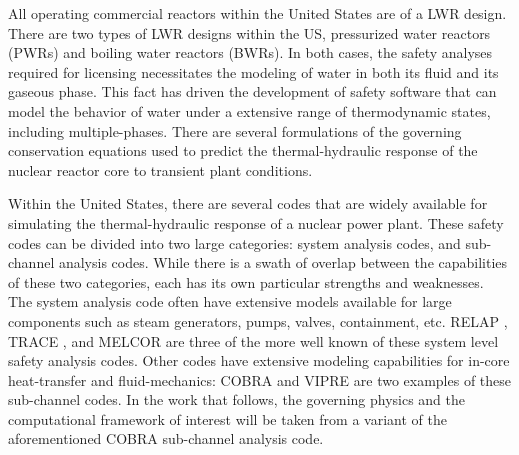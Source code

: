 All operating commercial reactors within the United States are of a LWR design.
There are two types of LWR designs within the US, pressurized water reactors (PWRs) and boiling water reactors (BWRs).
In both cases, the safety analyses required for licensing necessitates the modeling of water in both its fluid and its gaseous phase.
This fact has driven the development of safety software that can model the behavior of water under a extensive range of thermodynamic states, including multiple-phases.
There are several formulations of the governing conservation equations used to predict the thermal-hydraulic response of the nuclear reactor core to transient plant conditions.

Within the United States, there are several codes that are widely available for simulating the thermal-hydraulic response of a nuclear power plant.
These safety codes can be divided into two large categories: system analysis codes, and sub-channel analysis codes.
While there is a swath of overlap between the capabilities of these two categories, each has its own particular strengths and weaknesses.
The system analysis code often have extensive models available for large components such as steam generators, pumps, valves, containment, etc.
RELAP \cite{RELAP}, TRACE \cite{TRACE}, and MELCOR \cite{Summers1994} are three of the more well known of these system level safety analysis codes.
Other codes have extensive modeling capabilities for in-core heat-transfer and fluid-mechanics: COBRA \cite{Thurgood1983c} and VIPRE are two examples of these sub-channel codes.
In the work that follows, the governing physics and the computational framework of interest will be taken from a variant of the aforementioned COBRA sub-channel analysis code.
